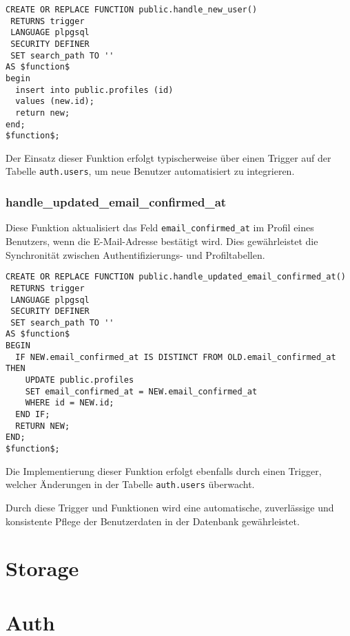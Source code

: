\begin{inhalt}
\begin{lstlisting}[style=mysql]
CREATE OR REPLACE FUNCTION public.handle_new_user()
 RETURNS trigger
 LANGUAGE plpgsql
 SECURITY DEFINER
 SET search_path TO ''
AS $function$
begin
  insert into public.profiles (id)
  values (new.id);
  return new;
end;
$function$;
\end{lstlisting}

Der Einsatz dieser Funktion erfolgt typischerweise über einen Trigger auf der Tabelle \texttt{auth.users}, um neue Benutzer automatisiert zu integrieren.

\subsubsection{handle\_updated\_email\_confirmed\_at}
Diese Funktion aktualisiert das Feld \texttt{email\_confirmed\_at} im Profil eines Benutzers, wenn die E-Mail-Adresse bestätigt wird. Dies gewährleistet die Synchronität zwischen Authentifizierungs- und Profiltabellen.

\begin{lstlisting}[style=mysql]
CREATE OR REPLACE FUNCTION public.handle_updated_email_confirmed_at()
 RETURNS trigger
 LANGUAGE plpgsql
 SECURITY DEFINER
 SET search_path TO ''
AS $function$
BEGIN
  IF NEW.email_confirmed_at IS DISTINCT FROM OLD.email_confirmed_at THEN
    UPDATE public.profiles
    SET email_confirmed_at = NEW.email_confirmed_at
    WHERE id = NEW.id;
  END IF;
  RETURN NEW;
END;
$function$;
\end{lstlisting}

Die Implementierung dieser Funktion erfolgt ebenfalls durch einen Trigger, welcher Änderungen in der Tabelle \texttt{auth.users} überwacht.

Durch diese Trigger und Funktionen wird eine automatische, zuverlässige und konsistente Pflege der Benutzerdaten in der Datenbank gewährleistet.


\section{Storage}

\section{Auth}









\end{inhalt}